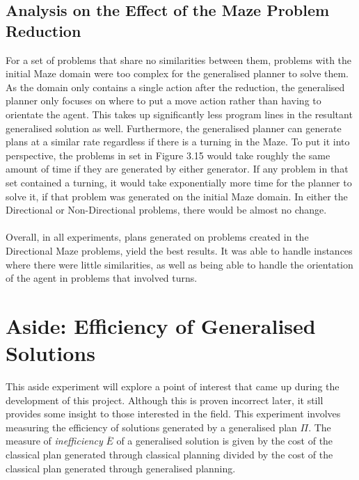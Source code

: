 \subsection{Analysis on the Effect of the Maze Problem Reduction}
For a set of problems that share no similarities between them, problems with the initial Maze domain were too complex for the generalised planner to solve them. As the domain only contains a single action after the reduction, the generalised planner only focuses on where to put a move action rather than having to orientate the agent. This takes up significantly less program lines in the resultant generalised solution as well. Furthermore, the generalised planner can generate plans at a similar rate regardless if there is a turning in the Maze. To put it into perspective, the problems in set in Figure 3.15 would take roughly the same amount of time if they are generated by either generator. If any problem in that set contained a turning, it would take exponentially more time for the planner to solve it, if that problem was generated on the initial Maze domain. In either the Directional or Non-Directional problems, there would be almost no change.\\\\
Overall, in all experiments, plans generated on problems created in the Directional Maze problems, yield the best results. It was able to handle instances where there were little similarities, as well as being able to handle the orientation of the agent in problems that involved turns.

\section{Aside: Efficiency of Generalised Solutions}
This aside experiment will explore a point of interest that came up during the development of this project. Although this is proven incorrect later, it still provides some insight to those interested in the field. This experiment involves measuring the efficiency of solutions generated by a generalised plan $\Pi$. The measure of \textit{inefficiency} $\overline{E}$ of a generalised solution is given by the cost of the classical plan generated through classical planning divided by the cost of the classical plan generated through generalised planning.

